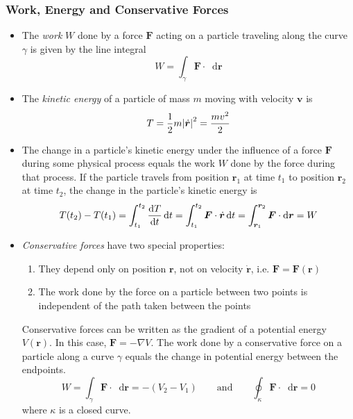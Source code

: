 \documentclass[11pt, a4paper]{article}
\newcommand{\diff}{\mathop{}\!\mathrm{d}} %
\newcommand{\bdot}[1]{\dot{\bm{#1}}}
\renewcommand{\grad}{\nabla }
\begin{document}
\subsubsection{Work, Energy and Conservative Forces}
\begin{itemize}
	\item The \textit{work} $ W $ done by a force $ \bm{F} $ acting on a particle traveling along the curve $ \gamma $ is given by the line integral 
	\begin{equation*}
		 W = \int_{\gamma} \bm{F} \cdot \diff \bm{r}
	\end{equation*}
	
	\item The \textit{kinetic energy} of a particle of mass $ m $ moving with velocity $ \bm{v} $ is
	\begin{equation*}
		T = \frac{1}{2}m \abs{\bdot{r}}^2 = \frac{m v^2}{2}
	\end{equation*}

	\item The change in a particle's kinetic energy under the influence of a force $ \bm{F} $ during some physical process equals the work $ W $ done by the force during that process. If the particle travels from position $ \bm{r}_1 $ at time $ t_1 $	to position $ \bm{r}_2 $ at time $ t_2 $, the change in the particle's kinetic energy is
	\begin{equation*}
		T(t_2) - T(t_1) = \int_{t_1}^{t_2} \dv{T}{t} \diff t = \int_{t_1}^{t_2} \bm{F} \cdot \dot{\bm{r}} \diff t = \int_{\bm{r}_1}^{\bm{r}_2} \bm{F} \cdot \diff \bm{r} = W
	\end{equation*}
	
	\item \textit{Conservative forces} have two special properties:
	\begin{enumerate}
		\item They depend only on position $ \bm{r} $, not on velocity $ \bdot{r} $, i.e. $ \bm{F} = \bm{F}(\bm{r}) $
		
		\item The work done by the force on a particle between two points is independent of the path taken between the points
	\end{enumerate}
	Conservative forces can be written as the gradient of a potential energy $ V(\bm{r}) $. In this case, $ \bm{F} = - \grad{V} $. The work done by a conservative force on a particle along a curve $ \gamma $ equals the change in potential energy between the endpoints.
	\begin{equation*}
		W = \int_{\gamma} \bm{F} \cdot \diff \bm{r} = - (V_2 - V_1) \qquad \text{and} \qquad \oint_{\kappa} \bm{F} \cdot \diff \bm{r} = 0
	\end{equation*}
	where $ \kappa $ is a closed curve.
	

\end{itemize}
\end{document}
